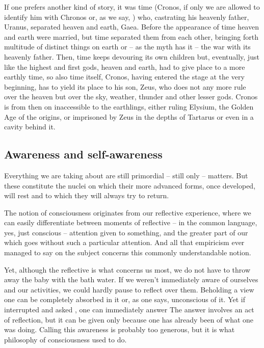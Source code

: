 \pa If one prefers another kind of story, it was time (Cronos, if only we are
allowed to identify him with Chronos or, as we say, )
who, castrating his heavenly father, Uranus, separated heaven and earth, Gaea.
Before the appearance of time heaven and earth were married, but time separated
them from each other, bringing forth multitude of distinct things on earth or --
as the myth has it -- the war with its heavenly father. Then, time keeps
devouring its own children but, eventually, just like the highest and first
gods, heaven and earth, had to give place to a more earthly time, so also time
itself, Cronos,  having entered the stage at the very
beginning, has to yield its place to his son, Zeus, who does not any more rule
over the heaven but over the sky, weather, thunder and other lesser gods. Cronos
is from then on inaccessible to the earthlings, either ruling Elysium, the
Golden Age of the origins, or imprisoned by Zeus in the depths of Tartarus
or even in a cavity behind it.


\subsection{Awareness and self-awareness}\label{sub:selfAware}

\pan Everything we are taking about are still primordial -- still only
 -- matters.  But these  constitute the nuclei on
which their more advanced forms, once developed, will rest and to which they
will always try to return.


\pa
The notion of consciousness originates from our reflective experience, where we can 
easily differentiate between moments of reflective -- in the common language, 
yes, just conscious -- attention given to something, and the greater part 
of our  which goes without such a particular attention. And  all 
that empiricism ever managed to say on the subject concerns 
this commonly understandable notion.

Yet, although the reflective  is what concerns us most, we do not
have to throw away the baby with the bath water. If we weren't immediately aware
of ourselves and our activities, we could hardly pause to reflect over them.
Beholding a view one can be completely absorbed in it or, as one says, unconscious
of it. Yet if interrupted and asked , one can immediately
answer  The answer involves an act of
reflection, but it can be given only because one has already been  of
what one was doing. Calling this awareness  is probably
too generous, but it is what philosophy of consciousness used to do.

